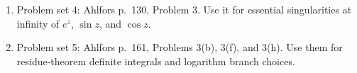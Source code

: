 \documentclass{article}
\begin{document}
\begin{enumerate}
  \item Problem set 4: Ahlfors p.~130, Problem 3. Use it for essential
  singularities at infinity of $e^z$, $\sin z$, and $\cos z$.

  \item Problem set 5: Ahlfors p.~161, Problems 3(b), 3(f), and 3(h). Use them
  for residue-theorem definite integrals and logarithm branch choices.
\end{enumerate}
\end{document}
